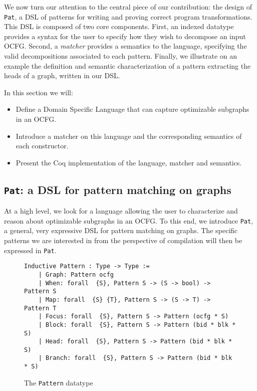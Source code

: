 \documentclass[11pt]{article}
\newcommand{\inlinecoq}[1]{\mbox{\lstinline[style=customcoq,columns=fixed,basewidth=.48em]{#1}}}
\newcommand{\ilc}[1]{\inlinecoq{#1}}
\newcommand{\yzt}[1]{\textcolor{ForestGreen!50}{#1}}
\newcommand{\cut}[1]{\textcolor{Gray!40}{#1}}
\begin{document}
\newcommand{\ocfg}{OCFG\xspace}
\newcommand{\pat}{\texttt{Pat}\xspace}

\yzt{We now turn our attention to the central piece of our contribution: the design of \pat{}, a DSL of patterns for writing and proving correct program transformations. This DSL is composed of two core components. First, an indexed datatype provides a syntax for the user to specify how they wish to decompose an input \ocfg. Second, a \emph{matcher} provides a semantics to the language, specifying the valid decompositions associated to each pattern. Finally, we illustrate on an example the definition and semantic characterization of a pattern extracting the heads of a graph, written in our DSL.}

\cut{
In this section we will:\begin{itemize}
  \item Define a Domain Specific Language that can capture optimizable subgraphs in an \ocfg\@.
  \item Introduce a matcher on this language and the corresponding semantics of each constructor.
  \item Present the Coq implementation of the language, matcher and semantics.
\end{itemize}
}

\subsection{\pat: a DSL for pattern matching on graphs}

\yzt{At a high level, we look for a language allowing the user to characterize and reason about optimizable subgraphs in an \ocfg. 
To this end, we introduce \pat, a general, very expressive DSL for pattern matching on graphs. The specific patterns we are interested in from the perspective of compilation will then be expressed in \pat.}

\begin{figure}[h]
  \begin{lstlisting}[style=customcoq,basicstyle=\small\ttfamily]
    Inductive Pattern : Type -> Type :=
    | Graph: Pattern ocfg
    | When: forall  {S}, Pattern S -> (S -> bool) -> Pattern S
    | Map: forall  {S} {T}, Pattern S -> (S -> T) -> Pattern T
    | Focus: forall  {S}, Pattern S -> Pattern (ocfg * S)
    | Block: forall  {S}, Pattern S -> Pattern (bid * blk * S)
    | Head: forall  {S}, Pattern S -> Pattern (bid * blk * S)
    | Branch: forall  {S}, Pattern S -> Pattern (bid * blk * S)
  \end{lstlisting}
  \label{fig:pat}
  \caption{The \ilc{Pattern} datatype}
\end{figure}
\end{document}

